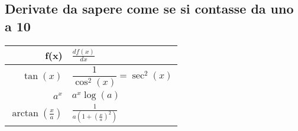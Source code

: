 \subsection{Derivate da sapere come se si contasse da uno a 10}
\begin{center}
\begin{tabular}{r | l}
	f(x) & $\frac{df(x)}{dx}$ \\ [1ex]
	\hline
	$\tan(x)$	& $\dfrac{1}{\cos^2(x)} = \sec^2(x)$ \\ [0.5ex]
	$a^x$		& $a^x \log(a)$ \\ [0.5ex]
	$\arctan(\frac{x}{a})$ & $\frac{1}{a(1+(\frac{x}{a})^2)}$ \\
\end{tabular}
\end{center}
